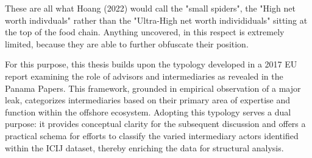 These are all what Hoang (2022) would call the "small spiders", the "High net worth indivduals" rather than the "Ultra-High net worth individiduals" sitting at the top of the food chain. Anything uncovered, in this respect is extremely limited, because they are able to further obfuscate their position.

For this purpose, this thesis builds upon the typology developed in a 2017 EU report examining the role of advisors and intermediaries as revealed in the Panama Papers. This framework, grounded in empirical observation of a major leak, categorizes intermediaries based on their primary area of expertise and function within the offshore ecosystem. Adopting this typology serves a dual purpose: it provides conceptual clarity for the subsequent discussion and offers a practical schema for efforts to classify the varied intermediary actors identified within the ICIJ dataset, thereby enriching the data for structural analysis.

